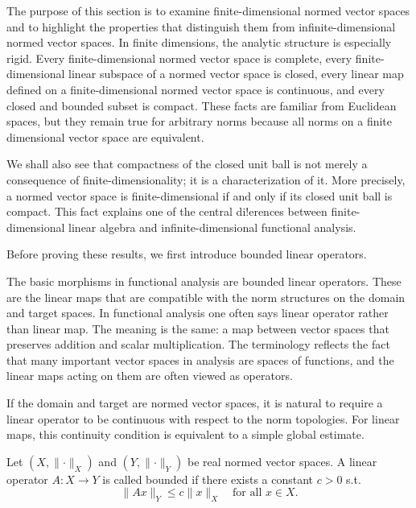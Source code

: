 The purpose of this section is to examine finite-dimensional normed vector spaces and to highlight the properties that distinguish them from infinite-dimensional normed vector spaces. In finite dimensions, the analytic structure is especially rigid. Every finite-dimensional normed vector space is complete, every finite-dimensional linear subspace of a normed vector space is closed, every linear map defined on a finite-dimensional normed vector space is continuous, and every closed and bounded subset is compact. These facts are familiar from Euclidean spaces, but they remain true for arbitrary norms because all norms on a finite dimensional vector space are equivalent.

We shall also see that compactness of the closed unit ball is not merely a consequence
of finite-dimensionality; it is a characterization of it. More precisely, a normed vector space is finite-dimensional if and only if its closed unit ball is compact. This fact explains one of the central di!erences between finite-dimensional linear algebra and infinite-dimensional functional analysis.

Before proving these results, we first introduce bounded linear operators.

The basic morphisms in functional analysis are bounded linear operators. These are the linear maps that are compatible with the norm structures on the domain and target spaces. In functional analysis one often says linear operator rather than linear map. The meaning is the same: a map between vector spaces that preserves addition and scalar multiplication. The terminology reflects the fact that many important vector spaces in analysis are spaces of functions, and the linear maps acting on them are often viewed as operators.

If the domain and target are normed vector spaces, it is natural to require a linear operator to be continuous with respect to the norm topologies. For linear maps, this continuity condition is equivalent to a simple global estimate.

\begin{definition}
    Let \((X, \lVert \cdot \rVert_X )\) and \((Y, \lVert \cdot \rVert_Y )\) be real normed vector spaces. A linear operator \(A: X \to Y\) is called bounded if there exists a constant \(c > 0\) s.t. 
    \begin{equation} \label{eq: bounded linear operator}
        \lVert Ax \rVert_Y \le c \lVert x \rVert_X \quad \text{for all } x \in X. 
    \end{equation}  
\end{definition}


